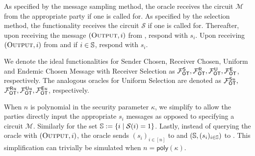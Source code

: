 \begin{definition}
As specified by the message sampling method, the oracle receives the circuit $\mathcal{M}$ from the appropriate party if one is called for.  As specified by the selection method, the functionality receives the circuit $\mathcal{S}$ if one is called for. 
Thereafter, upon receiving the message $(\textsc{Output}, i)$ from \send, respond with $s_i$. Upon receiving $(\textsc{Output}, i)$ from \rec and if $i\in \mathsf{\mathbb S}$,  respond with $s_i$. 

We denote the ideal functionalities for Sender Chosen, Receiver Chosen, Uniform and Endemic Chosen Message with Receiver Selection as $\mathcal{F}_{\mathsf{OT}}^\mathsf{S}, \mathcal{F}_{\mathsf{OT}}^\mathsf{R},\mathcal{F}_{\mathsf{OT}}^\mathsf{U},\mathcal{F}_{\mathsf{OT}}^\mathsf{E}$, respectively. The analogous oracles for Uniform Selection are denoted as  $\mathcal{F}_{\mathsf{OT}}^{\mathsf{S} u},$ $\mathcal{F}_{\mathsf{OT}}^{\mathsf{R} u}, \mathcal{F}_{\mathsf{OT}}^{\mathsf{U} u}, \mathcal{F}_{\mathsf{OT}}^{\mathsf{E} u}$, respectively.
\end{definition}
\begin{remark}
	When $n$ is polynomial in the security parameter $\kappa$, we simplify  to allow the parties directly input the appropriate $s_i$ messages as opposed to specifying a circuit $\mathcal{M}$. Similarly for the set $\mathsf{\mathbb S}:=\{i \mid \mathcal{S}(i)=1\}$. Lastly, instead of querying the oracle with $(\textsc{Output}, i)$, the oracle sends $(s_i)_{i\in [n]}$ to \send and $(\mathsf{\mathbb S}, (s_i)_{i\in\mathsf{\mathbb S}})$ to \rec. This simplification can trivially be simulated when $n=\textsf{poly}(\kappa)$.
\end{remark}




